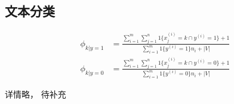 \subsection{文本分类}
\begin{align}
	\phi_{k|y=1} &= \frac{\sum_{i=1}^{m}\sum_{j=1}^{n}1\{x_j^{(i)}=k \cap y^{(i)}=1\}+1}{\sum_{i=1}^{m}1\{y^{(i)}=1\}n_i + |V|} \\
	\phi_{k|y=0} &= \frac{\sum_{i=1}^{m}\sum_{j=1}^{n}1\{x_j^{(i)}=k \cap y^{(i)}=0\}+1}{\sum_{i=1}^{m}1\{y^{(i)}=0\}n_i + |V|}
\end{align}


详情略， 待补充







